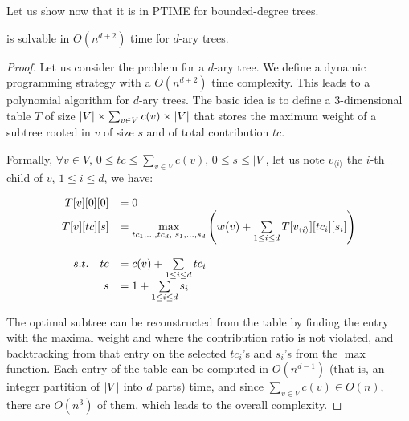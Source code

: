 		Let us show now that it is in PTIME for bounded-degree trees.
		\begin{proposition}
			\rbmwcs{} is solvable in $O(n^{d+2})$ time for $d$-ary trees.
			\label{prop:boundedDegreeTreesRBMWCS}
		\end{proposition}
		\begin{proof}
			Let us consider the \rbmwcs{} problem for a $d$-ary tree.
			We define a dynamic programming strategy with a $O(n^{d+2})$ time complexity.
			This leads to a polynomial algorithm for $d$-ary trees.
			The basic idea is to define a 3-dimensional table $T$ of size $\lvert V\rvert\times \sum_{v\in V}c(v) \times \lvert V\rvert$ that stores the maximum weight of a subtree rooted in $v$ of size $s$ and of total contribution $tc$.

			Formally, $\forall v\in V,\,0 \leq tc \leq \sum_{v\in V}c(v),\,0 \leq s \leq |V|$, let us note $v_{\langle i\rangle}$ the $i$-th child of $v$, $1 \leq i \leq d$, we have:

			\[
			  \begin{array}{rl}
					T[v][0][0]   &= 0 \\
				  T[v][tc][s]  &= \max\limits_{tc_1,\ldots,tc_d,\,\,s_1,\ldots, s_d}\left(w(v) +
											 \sum\limits_{1 \leq i \leq d}{T[v_{\langle i\rangle}][tc_i][s_i]}
										\right) \\
									& \vphantom{foo} \\
				  s.t.\quad tc &= c(v) + \sum\limits_{1 \leq i \leq d}{tc_i} \\
								s  &= 1    + \sum\limits_{1 \leq i \leq d}{s_i}
				\end{array}
			\]

			The optimal subtree can be reconstructed from the table by finding the entry with the maximal weight and where the contribution ratio is not violated, and backtracking from that entry on the selected $tc_i$'s and $s_i$'s from the $\max$ function.
			Each entry of the table can be computed in $O(n^{d-1})$ (that is, an integer partition of $\lvert V\rvert$ into $d$ parts) time, and since $\sum_{v\in V}c(v) \in O(n)$, there are $O(n^3)$ of them, which leads to the overall complexity.
		\end{proof}

